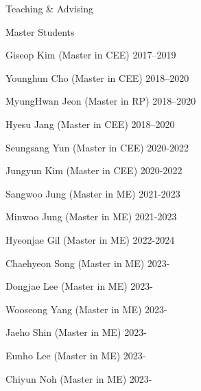 \begin{rSection}{Teaching \& Advising}
\begin{rSubsection}{Master Students}{}{}{}
  \item Giseop Kim (Master in \ac{CEE}) \hfill 2017--2019
  \item Younghun Cho (Master in \ac{CEE}) \hfill 2018--2020
  \item MyungHwan Jeon (Master in \ac{RP}) \hfill 2018--2020
  \item Hyesu Jang (Master in \ac{CEE}) \hfill 2018--2020
  \item Seungsang Yun (Master in \ac{CEE}) \hfill 2020-2022
  \item Jungyun Kim (Master in \ac{CEE}) \hfill 2020-2022
  \item Sangwoo Jung (Master in \ac{ME}) \hfill 2021-2023
  \item Minwoo Jung (Master in \ac{ME}) \hfill 2021-2023
  \item Hyeonjae Gil (Master in \ac{ME}) \hfill 2022-2024
  \item Chaehyeon Song (Master in \ac{ME}) \hfill 2023-
  \item Dongjae Lee (Master in \ac{ME}) \hfill 2023-
  \item Wooseong Yang (Master in \ac{ME}) \hfill 2023-
  \item Jaeho Shin (Master in \ac{ME}) \hfill 2023-
  \item Eunho Lee (Master in \ac{ME}) \hfill 2023-
  \item Chiyun Noh (Master in \ac{ME}) \hfill 2023-
\end{rSubsection}



\end{rSection}
